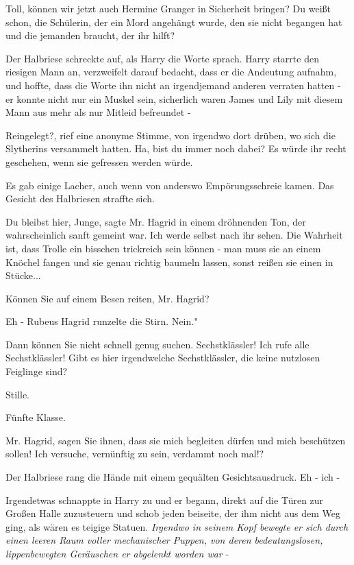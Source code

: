 \glqq Toll, können wir jetzt auch Hermine Granger in Sicherheit bringen? Du
weißt schon, die Schülerin, der ein Mord angehängt wurde, den sie nicht begangen
hat und die jemanden braucht, der ihr hilft?\grqq{}

Der Halbriese schreckte auf, als Harry die Worte sprach. Harry starrte den
riesigen Mann an, verzweifelt darauf bedacht, dass er die Andeutung aufnahm, und
hoffte, dass die Worte ihn nicht an irgendjemand anderen verraten hatten - er
konnte nicht nur ein Muskel sein, sicherlich waren James und Lily mit diesem
Mann aus mehr als nur Mitleid befreundet -

\glqq Reingelegt?\grqq{}, rief eine anonyme Stimme, von irgendwo dort drüben, wo
sich die Slytherins versammelt hatten. \glqq Ha, bist du immer noch dabei? Es
würde ihr recht geschehen, wenn sie gefressen werden würde.\grqq{}

Es gab einige Lacher, auch wenn von anderswo Empörungsschreie kamen. Das Gesicht
des Halbriesen straffte sich.

\glqq Du bleibst hier, Junge\grqq{}, sagte Mr. Hagrid in einem dröhnenden Ton,
der wahrscheinlich sanft gemeint war. \glqq Ich werde selbst nach ihr sehen. Die
Wahrheit ist, dass Trolle ein bisschen trickreich sein können - man muss sie an
einem Knöchel fangen und sie genau richtig baumeln lassen, sonst reißen sie
einen in Stücke...\grqq{}

\glqq Können Sie auf einem Besen reiten, Mr. Hagrid?\grqq{}

\glqq Eh -\grqq{} Rubeus Hagrid runzelte die Stirn. \glqq Nein."

\glqq Dann können Sie nicht schnell genug suchen. Sechstklässler! Ich rufe alle
Sechstklässler! Gibt es hier irgendwelche Sechstklässler, die keine nutzlosen
Feiglinge sind?\grqq{}

Stille.

\glqq Fünfte Klasse\grqq{}.

Mr. Hagrid, sagen Sie ihnen, dass sie mich begleiten dürfen und mich beschützen
sollen! Ich versuche, vernünftig zu sein, verdammt noch mal!?\grqq{}

Der Halbriese rang die Hände mit einem gequälten Gesichtsausdruck. \glqq Eh -
ich -\grqq{}

Irgendetwas schnappte in Harry zu und er begann, direkt auf die Türen zur Großen
Halle zuzusteuern und schob jeden beiseite, der ihm nicht aus dem Weg ging, als
wären es teigige Statuen. \emph{Irgendwo in seinem Kopf bewegte er sich durch
einen leeren Raum voller mechanischer Puppen, von deren bedeutungslosen,
lippenbewegten Geräuschen er abgelenkt worden war }-

